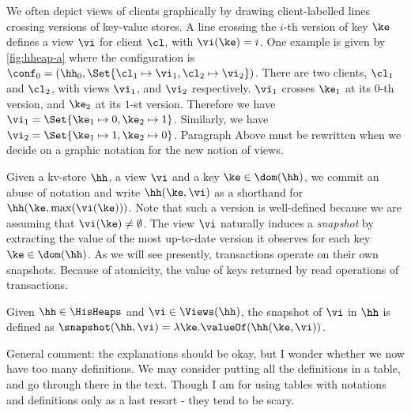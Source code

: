 We often depict views of clients graphically by drawing client-labelled lines crossing 
versions of key-value stores. A line crossing the $i$-th version of key $\ke$ defines a view 
$\vi$ for client $\cl$, with $\vi(\ke) = i$. One example is given by \cref{fig:hheap-a} where the configuration is
$\conf_0 = (\hh_0, \Set{\cl_1 \mapsto \vi_1, \cl_2 \mapsto \vi_2})$. 
There are two clients, 
$\cl_1$ and $\cl_2$, with views $\vi_1$, and $\vi_2$ respectively. $\vi_1$ crosses $\ke_1$ at its $0$-th 
version, and $\ke_2$ at its $1$-st version. Therefore we have $\vi_1 = \Set{\ke_1 \mapsto 0, \ke_2 \mapsto 1}$. 
Similarly, we have $\vi_2 = \Set{\ke_1 \mapsto 1, \ke_2 \mapsto 0}$. 
\ac{Paragraph Above must be rewritten when we decide on a graphic notation for 
the new notion of views.}

Given a kv-store $\hh$, a view $\vi$ and a key $\ke \in \dom(\hh)$, 
we commit an abuse of notation and write $\hh(\ke, \vi)$ as a shorthand 
for $\hh(\ke, \max(\vi(\ke)))$. Note that such a version is well-defined because 
we are assuming that $\vi(\ke) \neq \emptyset$.
The view $\vi$ naturally induces a \emph{snapshot} 
by extracting the value of the most up-to-date version it observes for each key $\ke \in \dom(\hh)$. 
As we will see presently, transactions operate on their own snapshots.
Because of atomicity, the value of keys returned 
by read operations of transactions. 
\begin{definition}[Snapshots]
\label{def:heaps}
\label{def:snapshot}
Given $\hh \in \HisHeaps$ and $\vi \in \Views(\hh)$, the snapshot of $\vi$ in 
$\hh$ is defined as $\snapshot(\hh, \vi) = \lambda \ke. \valueOf(\hh(\ke, \vi))$.
\end{definition}

\ac{General comment: the explanations should be okay, but I wonder whether we now have 
too many definitions. We may consider putting all the definitions in a table, and 
go through there in the text. Though I am for using tables with notations and 
definitions only as a last resort - they tend to be scary.}

